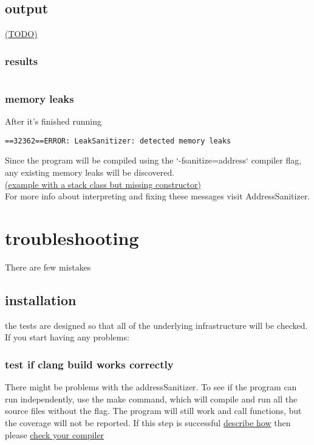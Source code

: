 \documentclass{elteikthesis}[2018/06/06]
\begin{document}
\subsection{output}
\label{sec-2-4-4}
\uline{(TODO)} \\
\subsubsection{results}
\label{sec-2-4-4-1}
\begin{center}
\begin{tabular}{}
\\
\\
\\
\end{tabular}
\end{center}
\subsubsection{memory leaks}
\label{sec-2-4-4-2}
After it's finished running \\
\begin{verbatim}
==32362==ERROR: LeakSanitizer: detected memory leaks
\end{verbatim}
Since the program will be compiled using the `-fsanitize=address` compiler flag, any existing memory leaks will be discovered. \\
\uline{(example with a stack class but missing constructor)} \\
For more info about interpreting and fixing these messages visit AddressSanitizer. \\
\section{troubleshooting}
\label{sec-2-5}
There are few mistakes \\
\subsection{installation}
\label{sec-2-5-1}
the tests are designed so that all of the underlying infrastructure will be checked. If you start having any problems: \\
\subsubsection{test if clang build works correctly}
\label{sec-2-5-1-1}
There might be problems with the addressSanitizer. To see if the program can run independently, use the make command, which will compile and run all the source files without the flag. The program will still work and call functions, but the coverage will not be reported. If this step is successful \uline{describe how} then please \uline{check your compiler} \\
\end{document}
